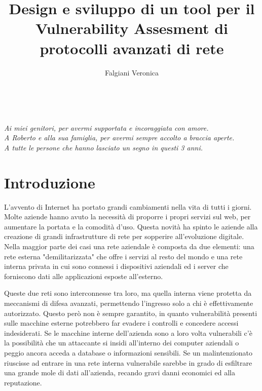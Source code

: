 \documentclass[12pt]{report}
\title{Design e sviluppo di un tool per il Vulnerability Assesment di protocolli avanzati di rete}
\author{Falgiani Veronica}
\begin{document}
\makecenteredfrontpage

\newpage 
\ %
\newpage

% 
%

{\raggedleft \large \sl Ai miei genitori, per avermi supportata e incoraggiata con amore.\\A Roberto e alla sua famiglia, per avermi sempre accolto a braccia aperte.\\A tutte le persone che hanno lasciato un segno in questi 3 anni.\\}

\clearpage
\beforepreface

% 
%



%
%


%
%

\afterpreface

% 
% 

\chapter{Introduzione}

L'avvento di Internet ha portato grandi cambiamenti nella vita di tutti i giorni. Molte aziende hanno avuto la necessità di proporre i propri servizi sul web, per aumentare la portata e la comodità d'uso. Questa novità ha spinto le aziende alla creazione di grandi infrastrutture di rete per sopperire all'evoluzione digitale. Nella maggior parte dei casi una rete aziendale è composta da due elementi: una rete esterna "demilitarizzata" che offre i servizi al resto del mondo e una rete interna privata in cui sono connessi i dispositivi aziendali ed i server che forniscono dati alle applicazioni esposte all'esterno.

Queste due reti sono interconnesse tra loro, ma quella interna viene protetta da meccanismi di difesa avanzati, permettendo l'ingresso solo a chi è effettivamente autorizzato. Questo però non è sempre garantito, in quanto vulnerabilità presenti sulle macchine esterne potrebbero far evadere i controlli e concedere accessi indesiderati. Se le macchine interne dell'azienda sono a loro volta vulnerabili c'è la possibilità che un attaccante si insidi all'interno dei computer aziendali o peggio ancora acceda a database o informazioni sensibili. Se un malintenzionato riuscisse ad entrare in una rete interna vulnerabile sarebbe in grado di esfiltrare una grande mole di dati all'azienda, recando gravi danni economici ed alla reputazione.
\end{document}
